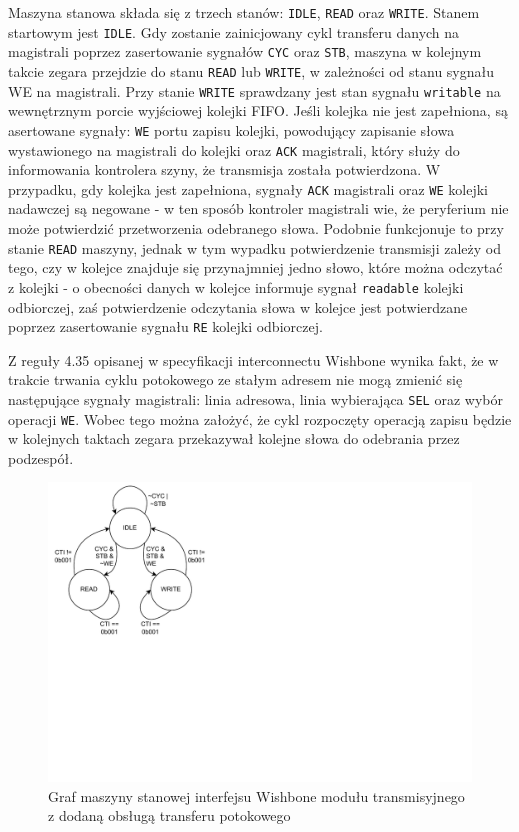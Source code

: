 Maszyna stanowa składa się z trzech stanów: \texttt{IDLE}, \texttt{READ} oraz \texttt{WRITE}.
Stanem startowym jest \texttt{IDLE}. Gdy zostanie zainicjowany cykl transferu danych na magistrali poprzez zasertowanie sygnałów \texttt{CYC} oraz \texttt{STB}, maszyna w kolejnym takcie zegara przejdzie do stanu \texttt{READ} lub \texttt{WRITE}, w zależności od stanu sygnału WE na magistrali.
Przy stanie \texttt{WRITE} sprawdzany jest stan sygnału \texttt{writable} na wewnętrznym porcie wyjściowej kolejki FIFO. Jeśli kolejka nie jest zapełniona, są asertowane sygnały: \texttt{WE} portu zapisu kolejki, powodujący zapisanie słowa wystawionego na magistrali do kolejki oraz \texttt{ACK} magistrali, który służy do informowania kontrolera szyny, że transmisja została potwierdzona. W przypadku, gdy kolejka jest zapełniona, sygnały \texttt{ACK} magistrali oraz \texttt{WE} kolejki nadawczej są negowane - w ten sposób kontroler magistrali wie, że peryferium nie może potwierdzić przetworzenia odebranego słowa.
Podobnie funkcjonuje to przy stanie \texttt{READ} maszyny, jednak w tym wypadku potwierdzenie transmisji zależy od tego, czy w kolejce znajduje się przynajmniej jedno słowo, które można odczytać z kolejki - o obecności danych w kolejce informuje sygnał \texttt{readable} kolejki odbiorczej, zaś potwierdzenie odczytania słowa w kolejce jest potwierdzane poprzez zasertowanie sygnału \texttt{RE} kolejki odbiorczej.

Z reguły 4.35 opisanej w specyfikacji interconnectu Wishbone wynika fakt, że w trakcie trwania cyklu potokowego ze stałym adresem nie mogą zmienić się następujące sygnały magistrali: linia adresowa, linia wybierająca \texttt{SEL} oraz wybór operacji \texttt{WE}. Wobec tego można założyć, że cykl rozpoczęty operacją zapisu będzie w kolejnych taktach zegara przekazywał kolejne słowa do odebrania przez podzespół.

\begin{figure}[H]
    \centering
    \includegraphics[scale=1,trim={0 7cm 13cm 0.1cm},clip]{implementation/fifo-fsm-burst.pdf}
    \caption{Graf maszyny stanowej interfejsu Wishbone modułu transmisyjnego z dodaną obsługą transferu potokowego}
    \label{fig:fifo-fsm-burst}
\end{figure}

